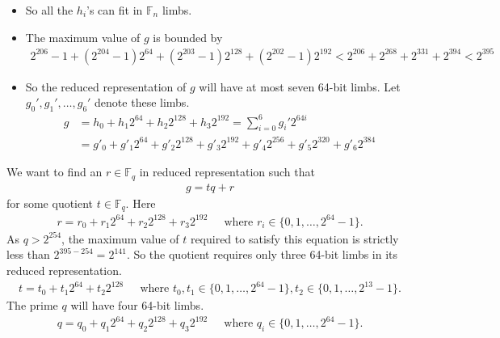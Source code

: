\documentclass[a4paper, 12pt]{article}
\begin{document}
\begin{itemize}
\begin{itemize}
    \end{itemize}
  \item So all the $h_i$'s can fit in $\mathbb{F}_n$ limbs.
  \item The maximum value of $g$ is bounded by
    \begin{align*}
      2^{206} - 1 + \left(2^{204} - 1\right) 2^{64}+ \left( 2^{203}-1 \right)2^{128}+ \left( 2^{202}-1 \right)2^{192} < 2^{206} + 2^{268} + 2^{331} + 2^{394} < 2^{395}
    \end{align*}
  \item So the reduced representation of $g$ will have at most seven 64-bit limbs. Let $g_0', g_1',\ldots,g_6'$ denote these limbs.
   \begin{align*}
   g & = h_0 + h_1 2^{64} + h_2 2^{128} + h_3 2^{192} = \sum^{6}_{i=0} g_i' 2^{64i}\\
     & = g'_0 + g'_1 2^{64} + g'_2 2^{128} + g'_3 2^{192} + g'_4 2^{256} +   g'_5 2^{320} + g'_6 2^{384}
   \end{align*}
\end{itemize}

We want to find an $r \in \mathbb{F}_q$ in reduced representation such that 
\begin{align}
  g = tq+r
  \label{eqn:g_equals_tq_plus_r1}
\end{align}
for some quotient $t \in \mathbb{F}_q$. Here
\begin{align*}
  r = r_0 + r_1 2^{64} + r_2 2^{128} + r_3 2^{192} \ \ \ \ \ \text{ where } r_i \in \{0,1,\ldots,2^{64}-1\}.
\end{align*}
As $q > 2^{254}$, the maximum value of $t$ required to satisfy this equation is strictly less than $2^{395-254} = 2^{141}$. So the quotient requires only three 64-bit limbs in its reduced representation.
\begin{align*}
  t = t_0 + t_1 2^{64} + t_2 2^{128}\ \ \ \ \ \text{ where } t_0, t_1 \in \{0,1,\ldots,2^{64}-1\}, t_2 \in \{0,1,\ldots,2^{13}-1\}.
\end{align*}
The prime $q$ will have four 64-bit limbs.
\begin{align*}
  q = q_0 + q_1 2^{64} + q_2 2^{128} + q_3 2^{192} \ \ \ \ \ \text{ where } q_i \in \{0,1,\ldots,2^{64}-1\}.
\end{align*}
\end{document}
